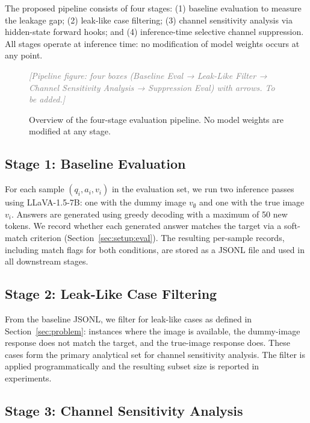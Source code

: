 \documentclass[12pt, a4paper]{article}
\newcommand{\placeholder}[1]{\textcolor{gray}{\textit{[#1]}}}
\begin{document}
The proposed pipeline consists of four stages:
(1) baseline evaluation to measure the leakage gap;
(2) leak-like case filtering;
(3) channel sensitivity analysis via hidden-state forward hooks; and
(4) inference-time selective channel suppression.
All stages operate at inference time: no modification of model weights occurs at any
point.

\begin{figure}[h]
\centering
\placeholder{Pipeline figure: four boxes (Baseline Eval → Leak-Like Filter → Channel
Sensitivity Analysis → Suppression Eval) with arrows. To be added.}
\caption{Overview of the four-stage evaluation pipeline.
No model weights are modified at any stage.}
\label{fig:pipeline}
\end{figure}

\subsection{Stage 1: Baseline Evaluation}

For each sample $(q_i, a_i, v_i)$ in the evaluation set, we run two inference passes
using LLaVA-1.5-7B: one with the dummy image $v_{\emptyset}$ and one with the true
image $v_i$.
Answers are generated using greedy decoding with a maximum of 50 new tokens.
We record whether each generated answer matches the target via a soft-match criterion
(Section~\ref{sec:setup:eval}).
The resulting per-sample records, including match flags for both conditions, are stored
as a JSONL file and used in all downstream stages.

\subsection{Stage 2: Leak-Like Case Filtering}

From the baseline JSONL, we filter for leak-like cases as defined in
Section~\ref{sec:problem}: instances where the image is available, the dummy-image
response does not match the target, and the true-image response does.
These cases form the primary analytical set for channel sensitivity analysis.
The filter is applied programmatically and the resulting subset size is reported in
experiments.

\subsection{Stage 3: Channel Sensitivity Analysis}
\end{document}
